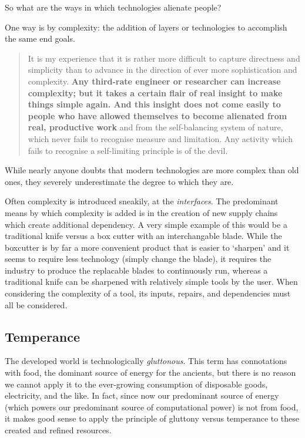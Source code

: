 \documentclass[letterpaper]{article}
\begin{document}
So what are the ways in which technologies alienate people? 

One way is by complexity: the addition of layers or technologies to accomplish the same end goals.

\begin{quote}
  It is my experience that it is rather more difficult to capture directness and simplicity than to advance in the direction of ever more sophistication and complexity. \textbf{Any third-rate engineer or researcher can increase complexity; but it takes a certain flair of real insight to make things simple again. And this insight does not come easily to people who have allowed themselves to become alienated from real, productive work} and from the self-balancing system of nature, which never fails to recognise measure and limitation. Any activity which fails to recognise a self-limiting principle is of the devil.
\end{quote}

While nearly anyone doubts that modern technologies are more complex than old ones, they severely underestimate the degree to which they are.

Often complexity is introduced sneakily, at the \textit{interfaces}. The predominant means by which complexity is added is in the creation of new supply chains which create additional dependency. A very simple example of this would be a traditional knife versus a box cutter with an interchangable blade. While the boxcutter is by far a more convenient product that is easier to `sharpen' and it seems to require less technology (simply change the blade), it requires the industry to produce the replacable blades to continuously run, whereas a traditional knife can be sharpened with relatively simple tools by the user. When considering the complexity of a tool, its inputs, repairs, and dependencies must all be considered.

\subsection{Temperance}

The developed world is technologically \textit{gluttonous}. This term has connotations with food, the dominant source of energy for the ancients, but there is no reason we cannot apply it to the ever-growing consumption of disposable goods, electricity, and the like. In fact, since now our predominant source of energy (which powers our predominant source of computational power) is not from food, it makes good sense to apply the principle of gluttony versus temperance to these created and refined resources.
\end{document}
